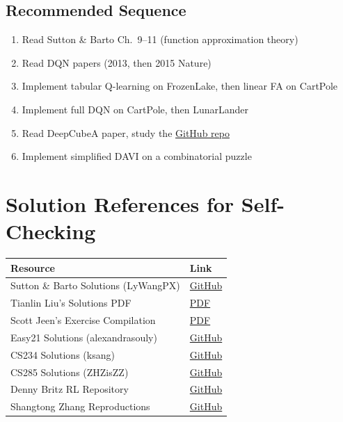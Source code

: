 \documentclass[11pt,letterpaper]{article}
\begin{document}
\subsection{Recommended Sequence}

\begin{enumerate}[nosep]
    \item Read Sutton \& Barto Ch.\ 9--11 (function approximation theory)
    \item Read DQN papers (2013, then 2015 Nature)
    \item Implement tabular Q-learning on FrozenLake, then linear FA on CartPole
    \item Implement full DQN on CartPole, then LunarLander
    \item Read DeepCubeA paper, study the \href{https://github.com/forestagostinelli/DeepCubeA}{GitHub repo}
    \item Implement simplified DAVI on a combinatorial puzzle
\end{enumerate}

\newpage
\section{Solution References for Self-Checking}

\begin{longtable}{@{}p{2.6in}p{3.2in}@{}}
\toprule
\textbf{Resource} & \textbf{Link} \\
\midrule
\endhead
Sutton \& Barto Solutions (LyWangPX) & \href{https://github.com/LyWangPX/Reinforcement-Learning-2nd-Edition-by-Sutton-Exercise-Solutions}{GitHub} \\
\addlinespace
Tianlin Liu's Solutions PDF & \href{https://tianlinliu.com/files/notes_exercise_RL.pdf}{PDF} \\
\addlinespace
Scott Jeen's Exercise Compilation & \href{https://enjeeneer.io/sutton_and_barto/rl_exercises.pdf}{PDF} \\
\addlinespace
Easy21 Solutions (alexandrasouly) & \href{https://github.com/alexandrasouly/easy21}{GitHub} \\
\addlinespace
CS234 Solutions (ksang) & \href{https://github.com/ksang/cs234-assignments}{GitHub} \\
\addlinespace
CS285 Solutions (ZHZisZZ) & \href{https://github.com/ZHZisZZ/cs285-homework-fall2021}{GitHub} \\
\addlinespace
Denny Britz RL Repository & \href{https://github.com/dennybritz/reinforcement-learning}{GitHub} \\
\addlinespace
Shangtong Zhang Reproductions & \href{https://github.com/ShangtongZhang/reinforcement-learning-an-introduction}{GitHub} \\
\bottomrule
\end{longtable}
\end{document}
